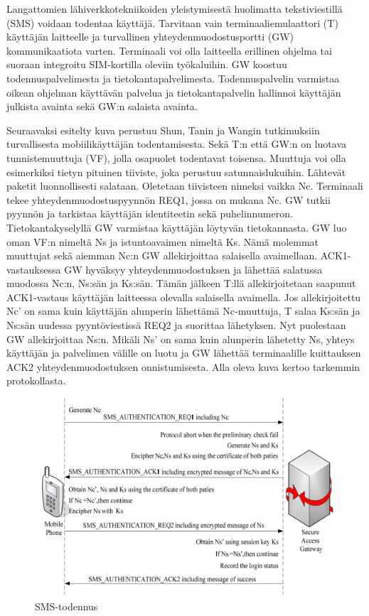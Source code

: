 \documentclass[finnish]{tktltiki2}
\theoremstyle{definition}
\theoremstyle{remark}
\begin{document}
Langattomien lähiverkkotekniikoiden yleistymisestä huolimatta tekstiviestillä (SMS) voidaan todentaa käyttäjä. Tarvitaan vain terminaaliemulaattori (T) käyttäjän laitteelle ja turvallinen yhteydenmuodostusportti (GW) kommunikaatiota varten. Terminaali voi olla laitteella erillinen ohjelma tai suoraan integroitu SIM-kortilla oleviin työkaluihin. GW koostuu todennuspalvelimesta ja tietokantapalvelimesta. Todennuspalvelin varmistaa oikean ohjelman käyttävän palvelua ja tietokantapalvelin hallinnoi käyttäjän julkista avainta sekä GW:n salaista avainta.

Seuraavaksi esitelty kuva perustuu Shun, Tanin ja Wangin \cite{sms} tutkimuksiin turvallisesta mobiilikäyttäjän todentamisesta. Sekä T:n että GW:n on luotava tunnistemuuttuja (VF), jolla osapuolet todentavat toisensa. Muuttuja voi olla esimerkiksi tietyn pituinen tiiviste, joka perustuu satunnaislukuihin. Lähtevät paketit luonnollisesti salataan. Oletetaan tiivisteen nimeksi vaikka Nc. Terminaali tekee yhteydenmuodostuspyynnön REQ1, jossa on mukana Nc. GW tutkii pyynnön ja tarkistaa käyttäjän identiteetin sekä puhelinnumeron. Tietokantakyselyllä GW varmistaa käyttäjän löytyvän tietokannasta. GW luo oman VF:n nimeltä Ns ja istuntoavaimen nimeltä Ks. Nämä molemmat muuttujat sekä aiemman Nc:n GW allekirjoittaa salaisella avaimellaan. ACK1-vastauksessa GW hyväksyy yhteydenmuodostuksen ja lähettää salatussa muodossa Nc:n, Ns:sän ja Ks:sän. Tämän jälkeen T:llä allekirjoitetaan saapunut ACK1-vastaus käyttäjän laitteessa olevalla salaisella avaimella. Jos allekirjoitettu Nc' on sama kuin käyttäjän alunperin lähettämä Nc-muuttuja, T salaa Ks:sän ja Ns:sän uudessa pyyntöviestissä REQ2 ja suorittaa lähetyksen. Nyt puolestaan GW allekirjoittaa Ns:n. Mikäli Ns' on sama kuin alunperin lähetetty Ns, yhteys käyttäjän ja palvelimen välille on luotu ja GW lähettää terminaalille kuittauksen ACK2 yhteydenmuodostuksen onnistumisesta. Alla oleva kuva kertoo tarkemmin protokollasta.   

\begin{figure}[h!]
\centering
	\includegraphics[scale=0.39]{sms-todennus}
\caption{SMS-todennus \cite{sms}}
\end{figure}
\end{document}
